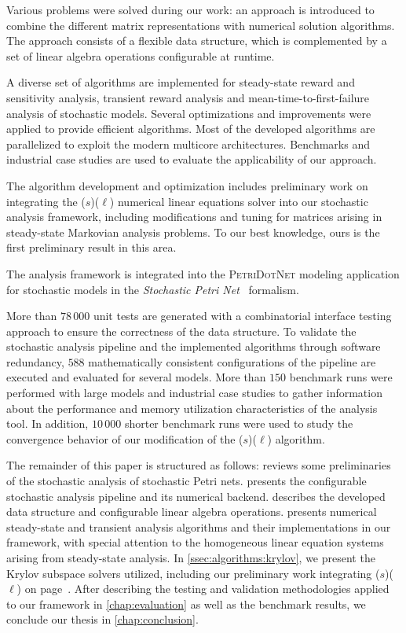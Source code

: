 Various problems were solved during our work: an approach is
introduced to combine the different matrix representations with
numerical solution algorithms. The approach consists of a flexible
data structure, which is complemented by a set of linear algebra
operations configurable at runtime.

A diverse set of algorithms are implemented for steady-state reward
and sensitivity analysis, transient reward analysis and
mean-time-to-first-failure analysis of stochastic models. Several
optimizations and improvements were applied to provide efficient
algorithms. Most of the developed algorithms are parallelized to
exploit the modern multicore architectures. Benchmarks and industrial
case studies are used to evaluate the applicability of our approach.

The algorithm development and optimization includes preliminary work
on integrating the ($s$)($\ell$) numerical
linear equations solver into our stochastic analysis framework,
including modifications and tuning for matrices arising in
steady-state Markovian analysis problems. To our best knowledge, ours
is the first preliminary result in this area.

The analysis framework is integrated into the \textsc{PetriDotNet}
modeling application for stochastic models in the \emph{Stochastic
  Petri Net}~ formalism.

More than $78\,000$ unit tests are generated with a combinatorial
interface testing approach to ensure the correctness of the data
structure. To validate the stochastic analysis pipeline and the
implemented algorithms through software redundancy, $588$
mathematically consistent configurations of the pipeline are executed
and evaluated for several models. More than $150$ benchmark runs were
performed with large models and industrial case studies to gather
information about the performance and memory utilization
characteristics of the analysis tool. In addition, $10\,000$ shorter
benchmark runs were used to study the convergence behavior of our
modification of the ($s$)($\ell$) algorithm.

The remainder of this paper is structured as follows:
 reviews some preliminaries of the stochastic
analysis of stochastic Petri nets.  presents the
configurable stochastic analysis pipeline and its numerical
backend.  describes the developed data structure
and configurable linear algebra operations. 
presents numerical steady-state and transient analysis algorithms and
their implementations in our framework, with special attention to the
homogeneous linear equation systems arising from steady-state
analysis. In \vref{ssec:algorithms:krylov}, we present the Krylov
subspace solvers utilized, including our preliminary work integrating
($s$)($\ell$) on
page~\pageref{ssec:algorithms:idrstab}. After describing the testing
and validation methodologies applied to our framework in
\cref{chap:evaluation} as well as the benchmark results, we conclude
our thesis in \cref{chap:conclusion}.
